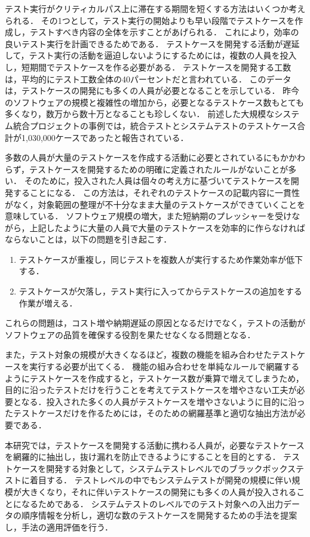 テスト実行がクリティカルパス上に滞在する期間を短くする方法はいくつか考えられる．
その1つとして，テスト実行の開始よりも早い段階でテストケースを作成し，テストすべき内容の全体を示すことがあげられる．
これにより，効率の良いテスト実行を計画できるためである．
テストケースを開発する活動が遅延して，テスト実行の活動を逼迫しないようにするためには，複数の人員を投入し，短期間でテストケースを作る必要がある．
テストケースを開発する工数は，平均的にテスト工数全体の40パーセントだと言われている\cite{van2013tpi}．
このデータは，テストケースの開発にも多くの人員が必要となることを示している．
昨今のソフトウェアの規模と複雑性の増加から，必要となるテストケース数もとても多くなり，数万から数十万となることも珍しくない．
前述した大規模なシステム統合プロジェクトの事例では，統合テストとシステムテストのテストケース合計が1,030,000ケースであったと報告されている．

多数の人員が大量のテストケースを作成する活動に必要とされているにもかかわらず，テストケースを開発するための明確に定義されたルールがないことが多い．
そのために，投入された人員は個々の考え方に基づいてテストケースを開発することになる．
この方法は，それぞれのテストケースの記載内容に一貫性がなく，対象範囲の整理が不十分なまま大量のテストケースができていくことを意味している．
ソフトウェア規模の増大，また短納期のプレッシャーを受けながら，上記したように大量の人員で大量のテストケースを効率的に作らなければならないことは，以下の問題を引き起こす．
\begin{enumerate}
\item テストケースが重複し，同じテストを複数人が実行するため作業効率が低下する．
\item テストケースが欠落し，テスト実行に入ってからテストケースの追加をする作業が増える．
\end{enumerate}

これらの問題は，コスト増や納期遅延の原因となるだけでなく，テストの活動がソフトウェアの品質を確保する役割を果たせなくなる問題となる\cite{mantyla2013more}\cite{mantyla2014time}．

また，テスト対象の規模が大きくなるほど，複数の機能を組み合わせたテストケースを実行する必要が出てくる．
機能の組み合わせを単純なルールで網羅するようにテストケースを作成すると，テストケース数が乗算で増えてしまうため，目的に沿ったテストだけを行うことを考えてテストケースを増やさない工夫が必要となる．投入された多くの人員がテストケースを増やさないように目的に沿ったテストケースだけを作るためには，そのための網羅基準と適切な抽出方法が必要である．

本研究では，テストケースを開発する活動に携わる人員が，必要なテストケースを網羅的に抽出し，抜け漏れを防止できるようにすることを目的とする．
テストケースを開発する対象として，システムテストレベルでのブラックボックステストに着目する．
テストレベルの中でもシステムテストが開発の規模に伴い規模が大きくなり，それに伴いテストケースの開発にも多くの人員が投入されることになるためである．
システムテストのレベルでのテスト対象への入出力データの順序情報を分析し，適切な数のテストケースを開発するための手法を提案し，手法の適用評価を行う．

